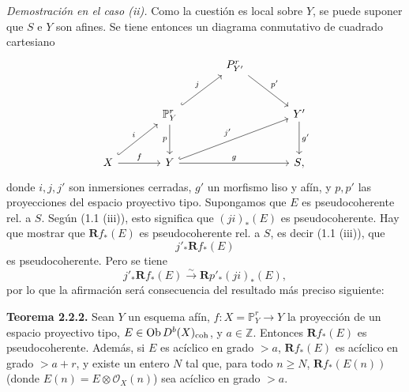 \emph{Demostración en el caso (ii).} Como la cuestión es local sobre \(Y\), se puede suponer que \(S\) e \(Y\) son afines. Se tiene entonces un diagrama conmutativo de cuadrado cartesiano
\[
\begin{tikzcd}[column sep=large,row sep=large]
& & P^r_{Y'} \arrow[dr,"p'"] & \\
& \mathbb P^r_Y \arrow[ur,hook,"j"] \arrow[d,"p"'] & & Y' \arrow[d,"g'"]\\
X \arrow[ur,hook,"i"] \arrow[r,"f"] & Y \arrow[urr,hook,"j'"] \arrow[rr,"g"] & & S{,}
\end{tikzcd}
\]
donde \(i,j,j'\) son inmersiones cerradas, \(g'\) un morfismo liso y afín, y \(p,p'\) las proyecciones del espacio proyectivo tipo. Supongamos que \(E\) es pseudocoherente rel. a \(S\). Según (1.1 (iii)), esto significa que \((ji)_*(E)\) es pseudocoherente. Hay que mostrar que \(\mathbf Rf_*(E)\) es pseudocoherente rel. a \(S\), es decir (1.1 (iii)), que
\[
 j'_*\mathbf Rf_*(E)
\]
es pseudocoherente. Pero se tiene
\[
 j'_*\mathbf Rf_*(E)\xrightarrow{\sim} \mathbf Rp'_*(ji)_*(E),
\]
por lo que la afirmación será consecuencia del resultado más preciso siguiente:

\textbf{Teorema 2.2.2.} Sean \(Y\) un esquema afín, \(f:X=\mathbb P^r_Y\longrightarrow Y\) la proyección de un espacio proyectivo tipo, \(E\in\operatorname{Ob} D^b(X)_{\mathrm{coh}}\), y \(a\in\mathbb Z\). Entonces \(\mathbf Rf_*(E)\) es pseudocoherente. Además, si \(E\) es acíclico en grado \(>a\), \(\mathbf Rf_*(E)\) es acíclico en grado \(>a+r\), y existe un entero \(N\) tal que, para todo \(n\geq N\), \(\mathbf Rf_*(E(n))\) (donde \(E(n)=E\otimes\mathcal O_X(n)\)) sea acíclico en grado \(>a\).

